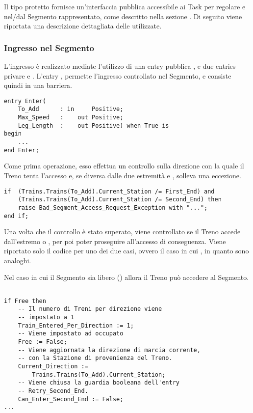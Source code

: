 	Il tipo protetto  fornisce un'interfaccia pubblica accessibile ai Task  per regolare  e  nel/dal Segmento rappresentato, come descritto nella sezione \label{subsubsec:segment_access}. Di seguito viene riportata una descrizione dettagliata delle  utilizzate.
	
	\subsubsection{Ingresso nel Segmento}
	
	L'ingresso è realizzato mediate l'utilizzo di una entry pubblica , e due entries privare  e .	
	L'entry , permette l'ingresso controllato nel Segmento, e consiste quindi in una barriera.

\begin{lstlisting}
entry Enter(
	To_Add      : in     Positive;
	Max_Speed   : 	 out Positive;
	Leg_Length  :    out Positive) when True is
begin
	...
end Enter;
\end{lstlisting}

	Come prima operazione, esso effettua un controllo sulla direzione con la quale il Treno tenta l'accesso e, se diversa dalle due estremità  e , solleva una eccezione.

\begin{lstlisting}
if  (Trains.Trains(To_Add).Current_Station /= First_End) and 
    (Trains.Trains(To_Add).Current_Station /= Second_End) then
	raise Bad_Segment_Access_Request_Exception with "...";
end if;
\end{lstlisting}

Una volta che il controllo è stato superato, viene controllato se il Treno accede dall'estremo  o , per poi poter proseguire all'accesso di conseguenza. Viene riportato solo il codice per uno dei due casi, ovvero il caso in cui , in quanto sono analoghi.

Nel caso in cui il Segmento sia libero () allora il Treno può accedere al Segmento.

\begin{lstlisting}

if Free then
	-- Il numero di Treni per direzione viene 
	-- impostato a 1
	Train_Entered_Per_Direction := 1;
	-- Viene impostato ad occupato
	Free := False;
	-- Viene aggiornata la direzione di marcia corrente,
	-- con la Stazione di provenienza del Treno.
	Current_Direction := 
		Trains.Trains(To_Add).Current_Station;
	-- Viene chiusa la guardia booleana dell'entry 
	-- Retry_Second_End. 
	Can_Enter_Second_End := False;
...

\end{lstlisting}

